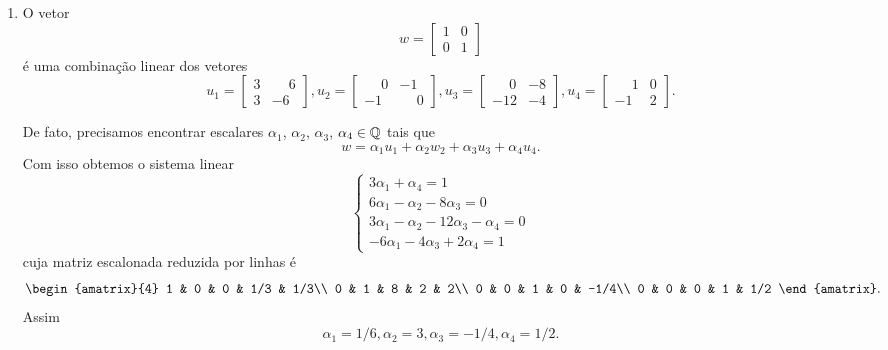 \begin{exemplo}
\begin{enumerate}[label={\arabic*})]
        \item O vetor
          \[
            w = \begin{bmatrix}
              1 & 0\\
              0 & 1
            \end{bmatrix}
          \]
          é uma combinação linear dos vetores
          \[
            u_1 = \begin{bmatrix}3 & \phantom{-}6\\3 & -6\end{bmatrix},
            u_2 = \begin{bmatrix}\phantom{-}0 & -1\\-1 & \phantom{-}0\end{bmatrix},
            u_3 = \begin{bmatrix}\phantom{-}0 & -8\\-12 & -4\end{bmatrix},
            u_4 = \begin{bmatrix}\phantom{-}1 & 0\\-1 & 2\end{bmatrix}.
          \]
          \begin{solucao}
            De fato, precisamos encontrar escalares $\alpha_1$, $\alpha_2$, $\alpha_3$, $\alpha_4 \in \mathbb{Q}$ tais que
            \[ w = \alpha_1 u_1 + \alpha_2 w_2 + \alpha_3 u_3 + \alpha_4 u_4.\]
            Com isso obtemos o sistema linear
            \[
              \begin{cases}
                3\alpha_1 + \alpha_4 = 1\\
                6\alpha_1 - \alpha_2 - 8\alpha_3 = 0\\
                3\alpha_1 - \alpha_2 - 12 \alpha_3 - \alpha_4 = 0\\
                -6\alpha_1 - 4\alpha_3 + 2\alpha_4 = 1
              \end{cases}
            \]
            cuja matriz escalonada reduzida por linhas é
            \[
              \begin{amatrix}{4}
                1 & 0 & 0 & 1/3 & 1/3\\
                0 & 1 & 8 & 2 & 2\\
                0 & 0 & 1 & 0 & -1/4\\
                0 & 0 & 0 & 1 & 1/2
              \end{amatrix}.
            \]
            Assim
            \[\alpha_1 = 1/6, \alpha_2 = 3, \alpha_3 = -1/4, \alpha_4 = 1/2.\]
          \end{solucao}
  \end{enumerate}
\end{exemplo}

